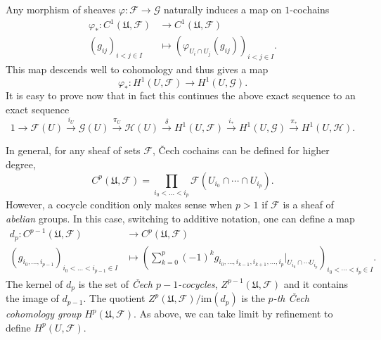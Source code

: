 	  Any morphism of sheaves $\varphi:\mathcal{F} \rightarrow \mathcal{G}$ naturally induces a map on $1$-cochains
	  \begin{align*}
	    \varphi_*:C^1(\mathfrak{U},\mathcal{F})&\longrightarrow C^1(\mathfrak{U},\mathcal{F})\\ 
	    (g_{ij})_{i<j \in I} &\longmapsto (\varphi_{U_i \cap U_j} (g_{ij}))_{i<j \in I}. 
	    \end{align*}
	    This map descends well to cohomology and thus gives a map $$\varphi_*:H^1(U,\mathcal{F}) \rightarrow H^1(U,\mathcal{G}).$$
	    It is easy to prove now that in fact this continues the above exact sequence to an exact sequence
	    \begin{equation*}
	      1\rightarrow \mathcal{F}(U) \overset{i_U}{\rightarrow} \mathcal{G}(U) \overset{\pi_U}{\rightarrow} \mathcal{H}(U) \overset{\delta}{\rightarrow} H^1(U,\mathcal{F}) \overset{i_*}{\rightarrow} H^1(U,\mathcal{G}) \overset{\pi_*}{\rightarrow} H^1(U,\mathcal{H}).
	    \end{equation*}
	  
	    In general, for any sheaf of sets $\mathcal{F}$, \v{C}ech cochains can be defined for higher degree,
	    \begin{equation*}
	      C^p(\mathfrak{U},\mathcal{F})=\prod_{i_0<\dots<i_p} \mathcal{F}(U_{i_0} \cap \cdots \cap U_{i_p}).
	    \end{equation*}
	    However, a cocycle condition only makes sense when $p>1$ if $\mathcal{F}$ is a sheaf of \emph{abelian} groups. In this case, switching to additive notation, one can define a map
	    \begin{align*}
	      d_p :C^{p-1}(\mathfrak{U},\mathcal{F})&\longrightarrow C^p(\mathfrak{U},\mathcal{F}) \\ 
	      (g_{i_0,\dots,i_{p-1}})_{i_0<\dots<i_{p-1}\in I} &\longmapsto \left( \sum_{k=0}^p (-1)^k g_{i_0,\dots,i_{k-1},i_{k+1},\dots,i_p}|_{U_{i_0} \cap \cdots U_{i_p}} \right)_{i_0<\cdots<i_p\in I}. 
	      \end{align*}
	      The kernel of $d_p$ is the set of \emph{\v{C}ech $p-1$-cocycles}, $Z^{p-1}(\mathfrak{U},\mathcal{F})$ and it contains the image of $d_{p-1}$. The quotient $Z^{p}(\mathfrak{U},\mathcal{F})/\mathrm{im}(d_p)$ is the \emph{$p$-th \v{C}ech cohomology group} $H^p(\mathfrak{U},\mathcal{F})$. As above, we can take limit by refinement to define $H^p(U,\mathcal{F})$.

